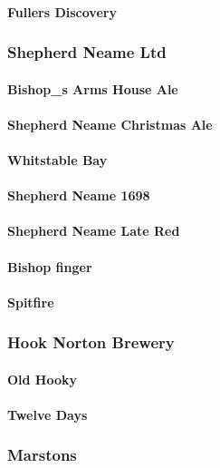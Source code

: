 \documentclass[11pt]{article}
\begin{document}
\paragraph{Fullers Discovery}
\label{sec:orge559f31}
\subsubsection{Shepherd Neame Ltd}
\label{sec:org995f153}
\paragraph{Bishop\_s Arms House Ale}
\label{sec:org6206eaa}
\paragraph{Shepherd Neame Christmas Ale}
\label{sec:org6449a90}
\paragraph{Whitstable Bay}
\label{sec:org8ee69e6}
\paragraph{Shepherd Neame 1698}
\label{sec:org088a8c4}
\paragraph{Shepherd Neame Late Red}
\label{sec:org26ead37}
\paragraph{Bishop finger}
\label{sec:orge347365}
\paragraph{Spitfire}
\label{sec:orga132c1a}
\subsubsection{Hook Norton Brewery}
\label{sec:org5738bb3}
\paragraph{Old Hooky}
\label{sec:org083c502}
\paragraph{Twelve Days}
\label{sec:org449e823}
\subsubsection{Marstons}
\label{sec:org72d119b}
\end{document}

